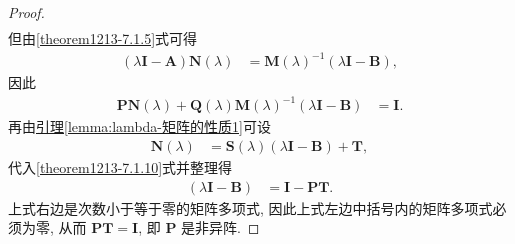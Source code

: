 \documentclass[../../main.tex]{subfiles}
\begin{document}
\begin{proof}
\begin{align*}
\end{align*}
但由\eqref{theorem1213-7.1.5}式可得
\begin{align*}
(\lambda\boldsymbol{I}-\boldsymbol{A})\boldsymbol{N}(\lambda)&=\boldsymbol{M}(\lambda)^{-1}(\lambda\boldsymbol{I}-\boldsymbol{B}),
\end{align*}
因此
\begin{align}
\boldsymbol{P}\boldsymbol{N}(\lambda)+\boldsymbol{Q}(\lambda)\boldsymbol{M}(\lambda)^{-1}(\lambda\boldsymbol{I}-\boldsymbol{B})&=\boldsymbol{I}. \label{theorem1213-7.1.10}
\end{align}
再由\hyperref[lemma:lambda-矩阵的性质1]{引理\ref{lemma:lambda-矩阵的性质1}}可设
\begin{align*}
\boldsymbol{N}(\lambda)&=\boldsymbol{S}(\lambda)(\lambda\boldsymbol{I}-\boldsymbol{B})+\boldsymbol{T},
\end{align*}
代入\eqref{theorem1213-7.1.10}式并整理得
\begin{align*}
[\boldsymbol{P}\boldsymbol{S}(\lambda)+\boldsymbol{Q}(\lambda)\boldsymbol{M}(\lambda)^{-1}](\lambda\boldsymbol{I}-\boldsymbol{B})&=\boldsymbol{I}-\boldsymbol{P}\boldsymbol{T}.
\end{align*}
上式右边是次数小于等于零的矩阵多项式, 因此上式左边中括号内的矩阵多项式必须为零, 从而 $\boldsymbol{P}\boldsymbol{T}=\boldsymbol{I}$, 即 $\boldsymbol{P}$ 是非异阵.

\end{proof}
\end{document}
